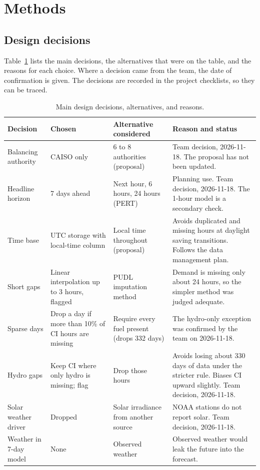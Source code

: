 \documentclass[10pt,journal,compsoc]{IEEEtran}
\begin{document}
\section{Methods}
\label{sec:methods}

\subsection{Design decisions}
Table~\ref{tab:decisions} lists the main decisions, the alternatives that were on the table, and the reasons for each choice. Where a decision came from the team, the date of confirmation is given. The decisions are recorded in the project checklists, so they can be traced.

\begin{table}[t]
\caption{Main design decisions, alternatives, and reasons.}
\label{tab:decisions}
\centering
\small
\begin{tabular}{@{}p{2.8cm}p{3.6cm}p{3.6cm}p{5.4cm}@{}}
\toprule
Decision & Chosen & Alternative considered & Reason and status \\
\midrule
Balancing authority & CAISO only & 6 to 8 authorities (proposal) & Team decision, 2026-11-18. The proposal has not been updated. \\
Headline horizon & 7 days ahead & Next hour, 6 hours, 24 hours (PERT) & Planning use. Team decision, 2026-11-18. The 1-hour model is a secondary check. \\
Time base & UTC storage with local-time column & Local time throughout (proposal) & Avoids duplicated and missing hours at daylight saving transitions. Follows the data management plan. \\
Short gaps & Linear interpolation up to 3 hours, flagged & PUDL imputation method & Demand is missing only about 24 hours, so the simpler method was judged adequate. \\
Sparse days & Drop a day if more than 10\% of CI hours are missing & Require every fuel present (drops 332 days) & The hydro-only exception was confirmed by the team on 2026-11-18. \\
Hydro gaps & Keep CI where only hydro is missing; flag & Drop those hours & Avoids losing about 330 days of data under the stricter rule. Biases CI upward slightly. Team decision, 2026-11-18. \\
Solar weather driver & Dropped & Solar irradiance from another source & NOAA stations do not report solar. Team decision, 2026-11-18. \\
Weather in 7-day model & None & Observed weather & Observed weather would leak the future into the forecast. \\

\end{tabular}
\end{table}
\end{document}
